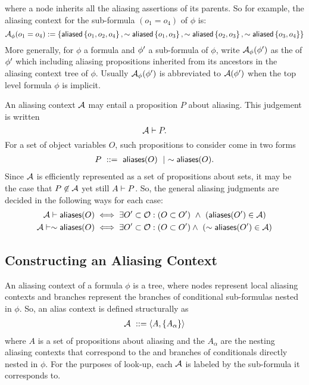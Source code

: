 %
where a node inherits all the aliasing assertions of its parents.
So for example, the aliasing context for the sub-formula $(o_1 = o_4)$ of $\phi$ is:
$$
  \mathcal{A}_\phi(o_1 = o_4) :=
  \left\{ 
    \textsf{aliased}\left\{ o_1, o_2, o_4 \right\},
    \sim \textsf{aliased}\left\{ o_1, o_3 \right\},
    \sim \textsf{aliased}\left\{ o_2, o_3 \right\},
    \sim \textsf{aliased}\left\{ o_3, o_4 \right\}
   \right\}
$$
More generally, for $\phi$ a formula and $\phi^\prime$ a sub-formula of $\phi$, write $\mathcal{A}_\phi(\phi^\prime)$ as the  of $\phi^\prime$ which including aliasing propositions inherited from its ancestors in the aliasing context tree of $\phi$. Usually $\mathcal{A}_\phi(\phi^\prime)$ is abbreviated to $\mathcal{A}(\phi^\prime)$ when the top level formula $\phi$ is implicit.

An aliasing context $\mathcal{A}$ may entail a proposition $P$ about aliasing. This judgement is written
$$
\mathcal{A} \vdash P.
$$
For a set of object variables $O$, such propositions to consider come in two forms
\begin{align*}
P \ ::= \ \textsf{aliases}(O) \ \mid \ \sim \textsf{aliases}(O).
\end{align*}
Since $\mathcal{A}$ is efficiently represented as a set of propositions about sets, it may be the case that $P \not\in \mathcal{A}$ yet still $A \vdash P$.
So, the general aliasing judgments are decided in the following ways for each case:
\begin{align*}
\mathcal{A} \vdash \textsf{aliases}(O)
&\iff
\exists O^\prime \subset \mathcal{O} : (O \subset O^\prime) \ \land \ (\textsf{aliases}(O^\prime) \in \mathcal{A})
\\
\mathcal{A} \vdash \sim \textsf{aliases}(O)
&\iff
\exists O^\prime \subset \mathcal{O} : (O \subset O^\prime) \land \ (\sim \textsf{aliases}(O^\prime) \in \mathcal{A})
\end{align*}

\subsection{Constructing an Aliasing Context}

\newcommand{\ctx}[2]{\langle #1, #2 \rangle}

An aliasing context of a formula $\phi$ is a tree, where nodes represent local aliasing contexts and branches represent the branches of conditional sub-formulas nested in $\phi$. So, an alias context is defined structurally as
\begin{align*}
  \A \ ::= \ctx{A}{\set{A_\alpha}}
\end{align*}
where $A$ is a set of propositions about aliasing and the $A_\alpha$ are the nesting aliasing contexts that correspond to the  and  branches of conditionals directly nested in $\phi$. For the purposes of look-up, each $\mathcal{A}$ is labeled by the sub-formula it corresponds to.

